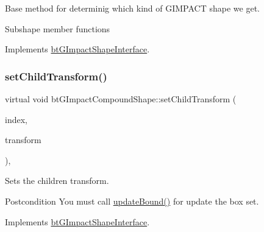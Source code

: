 Base method for determinig which kind of G\+I\+M\+P\+A\+CT shape we get. 

Subshape member functions 

Implements \hyperlink{classbtGImpactShapeInterface_a25cacbe448997e3f8ec99cb2d4952859}{bt\+G\+Impact\+Shape\+Interface}.

\mbox{\label{classbtGImpactCompoundShape_a560410e20842ad73227d7712a574385c}} 
\subsubsection{\texorpdfstring{set\+Child\+Transform()}{setChildTransform()}\hspace{0.1cm}{\footnotesize\ttfamily [1/2]}}
{\footnotesize\ttfamily virtual void bt\+G\+Impact\+Compound\+Shape\+::set\+Child\+Transform (\begin{DoxyParamCaption}\item[{int}]{index,  }\item[{const bt\+Transform \&}]{transform }\end{DoxyParamCaption})\hspace{0.3cm}{\ttfamily [inline]}, {\ttfamily [virtual]}}



Sets the children transform. 

\begin{DoxyPostcond}{Postcondition}
You must call \hyperlink{classbtGImpactShapeInterface_acb26c2d7a2aecabd06b996b72b848492}{update\+Bound()} for update the box set. 
\end{DoxyPostcond}


Implements \hyperlink{classbtGImpactShapeInterface_a83392f97bd7dfeb71ccdce6913a465b0}{bt\+G\+Impact\+Shape\+Interface}.

\mbox{\label{classbtGImpactCompoundShape_a560410e20842ad73227d7712a574385c}} 
